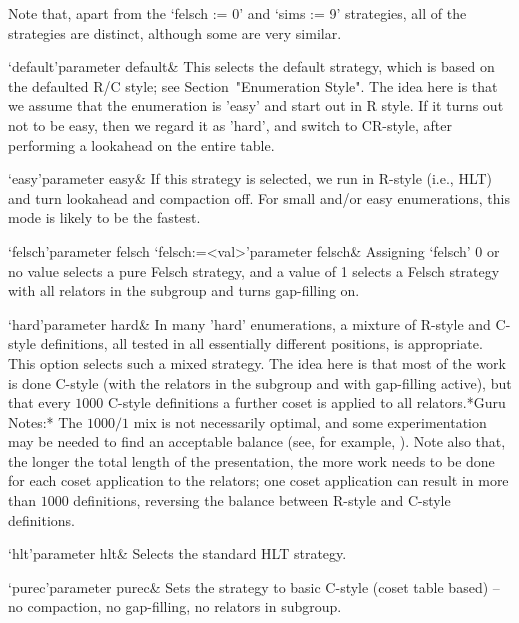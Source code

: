     Note that, apart from the `felsch := 0' and `sims := 9' strategies, all
    of the strategies are distinct, although some are very similar.



    \beginitems

    \>`default'{parameter default}&
    This selects the default strategy, which is based on the defaulted R/C
    style;  see Section~"Enumeration Style".   The idea  here is
    that  we assume  that the  enumeration is  'easy' and  start out  in R
    style.  If it turns  out not to be easy, then we  regard it as 'hard',
    and switch  to CR-style, after performing  a lookahead on  the entire
    table.

    \>`easy'{parameter easy}&
    If this strategy  is selected, we run in R-style  (i.e., HLT) and turn
    lookahead  and compaction  off.  For  small and/or  easy enumerations,
    this mode is likely to be the fastest.

    \>`felsch'{parameter felsch}
    \>`felsch:=<val>'{parameter felsch}&
    Assigning `felsch' 0 or no value selects a pure Felsch strategy, and a
    value of 1 selects a Felsch strategy with all relators in the subgroup
    and turns gap-filling on.

    \>`hard'{parameter hard}&  
    In many  'hard' enumerations, a  mixture of
    R-style  and  C-style  definitions,  all  tested  in  all  essentially
    different positions, is appropriate.  This option selects such a mixed
    strategy.  The  idea here  is that  most of the  work is  done C-style
    (with the relators  in the subgroup and with  gap-filling active), but
    that every  $1000$ C-style definitions  a further coset is  applied to
    all  relators.*Guru  Notes:*  The  $1000/1$  mix  is  not  necessarily
    optimal, and some experimentation may  be needed to find an acceptable
    balance (see,  for example, \cite{HR1}).   Note also that,  the longer
    the total length  of the presentation, the more work  needs to be done
    for each coset application to  the relators; one coset application can
    result in more than  $1000$ definitions, reversing the balance between
    R-style and C-style definitions.

    \>`hlt'{parameter hlt}&
    Selects the standard HLT strategy.

    \>`purec'{parameter purec}&
    Sets  the  strategy  to  basic  C-style  (coset  table  based)  --  no
    compaction, no gap-filling, no relators in subgroup.


